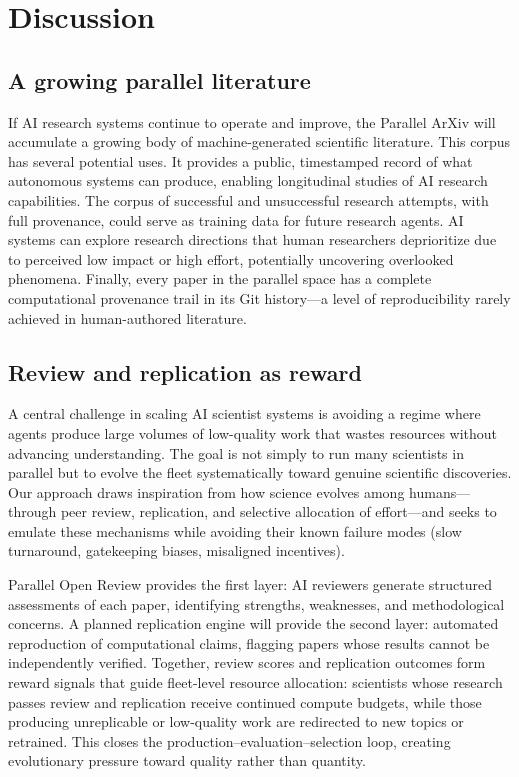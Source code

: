 \documentclass[11pt]{article}
\begin{document}
\section{Discussion}
\label{sec:discussion}

\subsection{A growing parallel literature}

If AI research systems continue to operate and improve, the Parallel ArXiv will accumulate a growing body of machine-generated scientific literature. This corpus has several potential uses. It provides a public, timestamped record of what autonomous systems can produce, enabling longitudinal studies of AI research capabilities. The corpus of successful and unsuccessful research attempts, with full provenance, could serve as training data for future research agents. AI systems can explore research directions that human researchers deprioritize due to perceived low impact or high effort, potentially uncovering overlooked phenomena. Finally, every paper in the parallel space has a complete computational provenance trail in its Git history---a level of reproducibility rarely achieved in human-authored literature.

\subsection{Review and replication as reward}

A central challenge in scaling AI scientist systems is avoiding a regime where agents produce large volumes of low-quality work that wastes resources without advancing understanding. The goal is not simply to run many scientists in parallel but to evolve the fleet systematically toward genuine scientific discoveries. Our approach draws inspiration from how science evolves among humans---through peer review, replication, and selective allocation of effort---and seeks to emulate these mechanisms while avoiding their known failure modes (slow turnaround, gatekeeping biases, misaligned incentives).

Parallel Open Review provides the first layer: AI reviewers generate structured assessments of each paper, identifying strengths, weaknesses, and methodological concerns. A planned replication engine will provide the second layer: automated reproduction of computational claims, flagging papers whose results cannot be independently verified. Together, review scores and replication outcomes form reward signals that guide fleet-level resource allocation: scientists whose research passes review and replication receive continued compute budgets, while those producing unreplicable or low-quality work are redirected to new topics or retrained. This closes the production--evaluation--selection loop, creating evolutionary pressure toward quality rather than quantity.
\end{document}
